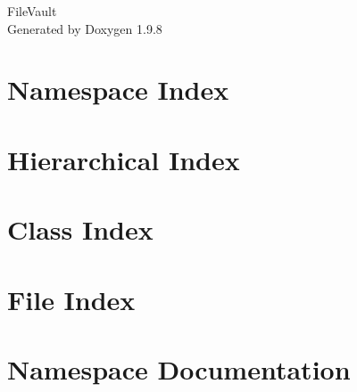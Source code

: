 \documentclass[twoside]{book}
\newcommand{\+}{\discretionary{\mbox{\scriptsize$\hookleftarrow$}}{}{}}
\newcommand{\clearemptydoublepage}{%
    \newpage{\pagestyle{empty}\cleardoublepage}%
  }
\begin{document}
  \raggedbottom
    \hypersetup{pageanchor=false,
                bookmarksnumbered=true,
                pdfencoding=unicode
               }
  \begin{titlepage}
  \vspace*{7cm}
  \begin{center}%
  {\Large File\+Vault}\\
  \vspace*{1cm}
  {\large Generated by Doxygen 1.9.8}\\
  \end{center}
  \end{titlepage}
  \clearemptydoublepage
  \tableofcontents
  \clearemptydoublepage
  \hypersetup{pageanchor=true}

\chapter{Namespace Index}

\chapter{Hierarchical Index}

\chapter{Class Index}

\chapter{File Index}

\chapter{Namespace Documentation}















\end{document}
